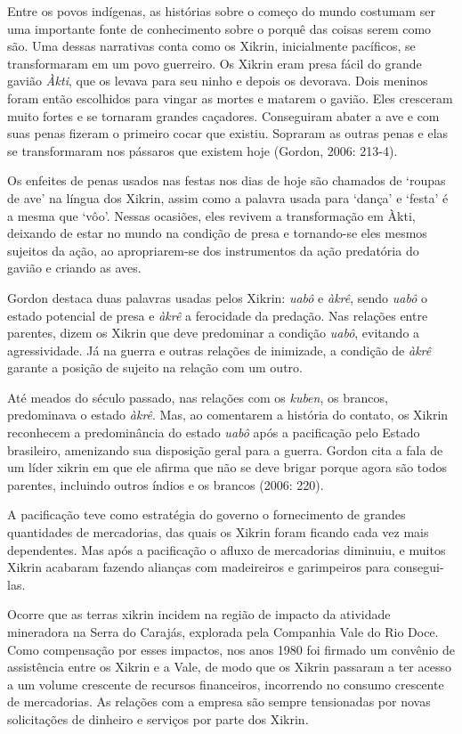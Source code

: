 {Entre os povos indígenas, as histórias sobre o começo do mundo costumam
ser uma importante fonte de conhecimento sobre o porquê das coisas
serem como são. Uma dessas narrativas conta como os Xikrin,
inicialmente pacíficos, se transformaram em um povo guerreiro. Os
Xikrin eram presa fácil do grande gavião \emph{Àkti}, que os levava para seu
ninho e depois os devorava. Dois meninos foram então escolhidos para
vingar as mortes e matarem o gavião. Eles cresceram muito fortes e se
tornaram grandes caçadores. Conseguiram abater a ave e com suas penas
fizeram o primeiro cocar que existiu. Sopraram as outras penas e elas
se transformaram nos pássaros que existem hoje (Gordon, 2006: 213-4). 

Os enfeites de penas usados nas festas nos dias de hoje são chamados de
`roupas de ave' na língua dos Xikrin, assim como a palavra usada para
`dança' e `festa' é a mesma que `vôo'. Nessas ocasiões, eles revivem a
transformação em Àkti, deixando de estar no mundo na condição de presa e
tornando-se eles mesmos sujeitos da ação, ao apropriarem-se dos
instrumentos da ação predatória do gavião e criando as aves.

Gordon destaca duas palavras usadas pelos Xikrin: \emph{uabô} e \emph{àkrê}, sendo
\emph{uabô} o estado potencial de presa e \emph{àkrê} a ferocidade da predação. Nas
relações entre parentes, dizem os Xikrin que deve predominar a condição
\emph{uabô}, evitando a agressividade. Já na guerra e outras relações de
inimizade, a condição de \emph{àkrê} garante a posição de sujeito na relação
com um outro. 

Até meados do século passado, nas relações com os \emph{kuben}, os brancos,
predominava o estado \emph{àkrê}. Mas, ao comentarem a história do contato, os
Xikrin reconhecem a predominância do estado \emph{uabô} após a pacificação
pelo Estado brasileiro, amenizando sua disposição geral para a guerra.
Gordon cita a fala de um líder xikrin em que ele afirma que não se deve
brigar porque agora são todos parentes, incluindo outros índios e os
brancos (2006: 220). 

A pacificação teve como estratégia do governo o fornecimento de grandes
quantidades de mercadorias, das quais os Xikrin foram ficando cada vez
mais dependentes. Mas após a pacificação o afluxo de mercadorias
diminuiu, e muitos Xikrin acabaram fazendo alianças com madeireiros e
garimpeiros para consegui-las. 

Ocorre que as terras xikrin incidem na região de impacto da atividade
mineradora na Serra do Carajás, explorada pela Companhia Vale do Rio
Doce. Como compensação por esses impactos, nos anos 1980 foi firmado um
convênio de assistência entre os Xikrin e a Vale, de modo que os Xikrin
passaram a ter acesso a um volume crescente de recursos financeiros,
incorrendo no consumo crescente de mercadorias. As relações com a
empresa são sempre tensionadas por novas solicitações de dinheiro e
serviços por parte dos Xikrin. 

}
